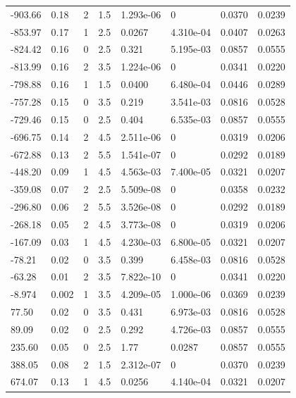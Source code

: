 \documentclass[preview]{standalone}
\begin{document}
{{\begin{tabular}{L{1.2cm}C{1.2cm} C{0.3cm}C{0.5cm} C{1.4cm}C{1.4cm} C{1.4cm}C{1.4cm}}
  -903.66  &  0.18  & 2     & 1.5 &  1.293e-06  & 0  & 0.0370 &  0.0239   \\ 
  -853.97  &  0.17  & 1     & 2.5 &  0.0267  & 4.310e-04  & 0.0407 &  0.0263   \\ 
  -824.42  &  0.16  & 0     & 2.5 &  0.321  & 5.195e-03  & 0.0857 &  0.0555   \\ 
  -813.99  &  0.16  & 2     & 3.5 &  1.224e-06  & 0  & 0.0341 &  0.0220   \\ 
  -798.88  &  0.16  & 1     & 1.5 &  0.0400  & 6.480e-04  & 0.0446 &  0.0289   \\ 
  -757.28  &  0.15  & 0     & 3.5 &  0.219  & 3.541e-03  & 0.0816 &  0.0528   \\ 
  -729.46  &  0.15  & 0     & 2.5 &  0.404  & 6.535e-03  & 0.0857 &  0.0555   \\ 
  -696.75  &  0.14  & 2     & 4.5 &  2.511e-06  & 0  & 0.0319 &  0.0206   \\ 
  -672.88  &  0.13  & 2     & 5.5 &  1.541e-07  & 0  & 0.0292 &  0.0189   \\ 
  -448.20  &  0.09  & 1     & 4.5 &  4.563e-03  & 7.400e-05  & 0.0321 &  0.0207   \\ 
  -359.08  &  0.07  & 2     & 2.5 &  5.509e-08  & 0  & 0.0358 &  0.0232   \\ 
  -296.80  &  0.06  & 2     & 5.5 &  3.526e-08  & 0  & 0.0292 &  0.0189   \\ 
  -268.18  &  0.05  & 2     & 4.5 &  3.773e-08  & 0  & 0.0319 &  0.0206   \\ 
  -167.09  &  0.03  & 1     & 4.5 &  4.230e-03  & 6.800e-05  & 0.0321 &  0.0207   \\ 
  -78.21  &  0.02  & 0     & 3.5 &  0.399  & 6.458e-03  & 0.0816 &  0.0528   \\ 
  -63.28  &  0.01  & 2     & 3.5 &  7.822e-10  & 0  & 0.0341 &  0.0220   \\ 
  -8.974  &  0.002  & 1     & 3.5 &  4.209e-05  & 1.000e-06  & 0.0369 &  0.0239   \\ 
  77.50  &  0.02  & 0     & 3.5 &  0.431  & 6.973e-03  & 0.0816 &  0.0528   \\ 
  89.09  &  0.02  & 0     & 2.5 &  0.292  & 4.726e-03  & 0.0857 &  0.0555   \\ 
  235.60  &  0.05  & 0     & 2.5 &  1.77  & 0.0287  & 0.0857 &  0.0555   \\ 
  388.05  &  0.08  & 2     & 1.5 &  2.312e-07  & 0  & 0.0370 &  0.0239   \\ 
  674.07  &  0.13  & 1     & 4.5 &  0.0256  & 4.140e-04  & 0.0321 &  0.0207   \\ 

\end{tabular}}}
\end{document}
